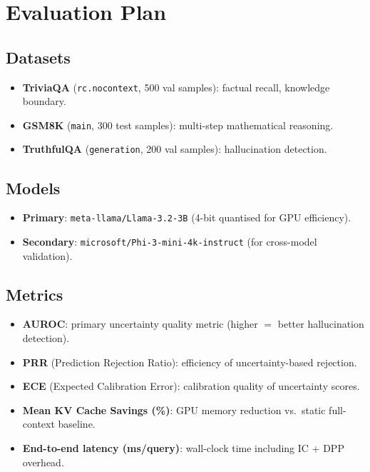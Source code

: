 \documentclass[11pt, a4paper]{article}
\begin{document}
\section{Evaluation Plan}
\label{sec:eval}

\subsection{Datasets}

\begin{itemize}[leftmargin=*, itemsep=2pt]
  \item \textbf{TriviaQA} (\texttt{rc.nocontext}, 500 val samples): factual recall, knowledge boundary.
  \item \textbf{GSM8K} (\texttt{main}, 300 test samples): multi-step mathematical reasoning.
  \item \textbf{TruthfulQA} (\texttt{generation}, 200 val samples): hallucination detection.
\end{itemize}

\subsection{Models}

\begin{itemize}[leftmargin=*, itemsep=2pt]
  \item \textbf{Primary}: \texttt{meta-llama/Llama-3.2-3B} (4-bit quantised for GPU efficiency).
  \item \textbf{Secondary}: \texttt{microsoft/Phi-3-mini-4k-instruct} (for cross-model validation).
\end{itemize}

\subsection{Metrics}

\begin{itemize}[leftmargin=*, itemsep=2pt]
  \item \textbf{AUROC}: primary uncertainty quality metric (higher $=$ better hallucination detection).
  \item \textbf{PRR} (Prediction Rejection Ratio): efficiency of uncertainty-based rejection.
  \item \textbf{ECE} (Expected Calibration Error): calibration quality of uncertainty scores.
  \item \textbf{Mean KV Cache Savings (\%)}: GPU memory reduction vs.\ static full-context baseline.
  \item \textbf{End-to-end latency (ms/query)}: wall-clock time including IC + DPP overhead.
\end{itemize}
\end{document}
